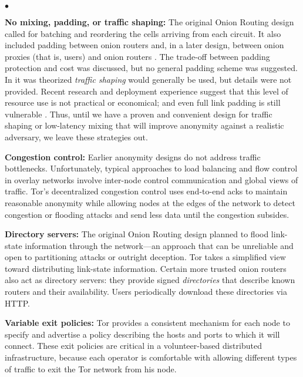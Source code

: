 \documentclass[times,10pt,twocolumn]{article}
\newenvironment{tightlist}{\begin{list}{$\bullet$}{
  \setlength{\itemsep}{0mm}
    \setlength{\parsep}{0mm}
    }}{\end{list}}
\begin{document}
\begin{tightlist}
\item \textbf{No mixing, padding, or traffic shaping:} The original Onion
Routing design called for batching and reordering the cells arriving from
each circuit. It also included padding between onion routers and, in a
later design, between onion proxies (that is, users) and onion routers
\cite{or-ih96,or-jsac98}.  The trade-off between padding protection
and cost was discussed, but no general padding scheme was suggested. In
\cite{or-pet00} it was theorized \emph{traffic shaping} would generally
be used, but details were not provided.  Recent research \cite{econymics}
and deployment experience \cite{freedom21-security} suggest that this
level of resource use is not practical or economical; and even full link
padding is still vulnerable \cite{defensive-dropping}. Thus, until we
have a proven and convenient design for traffic shaping or low-latency
mixing that will improve anonymity against a realistic adversary, we
leave these strategies out.

\item \textbf{Congestion control:} Earlier anonymity designs do not
address traffic bottlenecks. Unfortunately, typical approaches to
load balancing and flow control in overlay networks involve inter-node
control communication and global views of traffic. Tor's decentralized
congestion control uses end-to-end acks to maintain reasonable anonymity
while allowing nodes at the edges of the network to detect congestion
or flooding attacks and send less data until the congestion subsides.

\item \textbf{Directory servers:} The original Onion Routing design
planned to flood link-state information through the network---an approach
that can be unreliable and open to partitioning attacks or outright
deception. Tor takes a simplified view toward distributing link-state
information. Certain more trusted onion routers also act as directory
servers: they provide signed \emph{directories} that describe known
routers and their availability.  Users periodically download these
directories via HTTP.

\item \textbf{Variable exit policies:} Tor provides a consistent mechanism
for each node to specify and advertise a policy describing the hosts
and ports to which it will connect. These exit policies are critical
in a volunteer-based distributed infrastructure, because each operator
is comfortable with allowing different types of traffic to exit the Tor
network from his node.


\end{tightlist}
\end{document}
